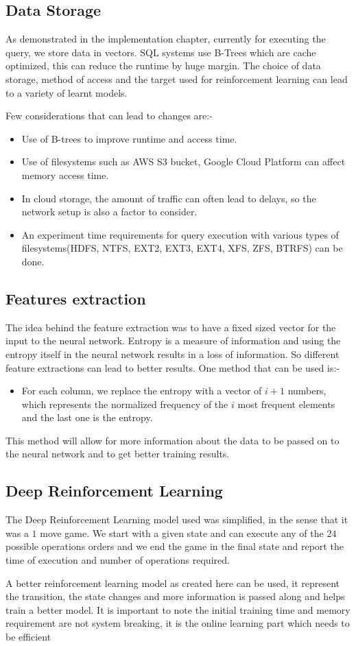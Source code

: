 \subsection{Data Storage}
As demonstrated in the implementation chapter, currently for executing the query, we store data in vectors. SQL systems use B-Trees which are cache optimized, this can reduce the runtime by huge margin. The choice of data storage, method of access and the target used for reinforcement learning can lead to a variety of learnt models.
\par Few considerations that can lead to changes are:-
\begin{itemize}
    \item Use of B-trees to improve runtime and access time.
    \item Use of filesystems such as AWS S3 bucket, Google Cloud Platform can affect memory access time.
    \item In cloud storage, the amount of traffic can often lead to delays, so the network setup is also a factor to consider.
    \item An experiment time requirements for query execution with various types of filesystems(HDFS, NTFS, EXT2, EXT3, EXT4, XFS, ZFS, BTRFS) can be done. 
\end{itemize} 

\subsection{Features extraction}
The idea behind the feature extraction was to have a fixed sized vector for the input to the neural network. Entropy is a measure of information and using the entropy itself in the neural network results in a loss of information. So different feature extractions can lead to better results. One method that can be used is:-
\begin{itemize}
    \item For each column, we replace the entropy with a vector of $i+1$ numbers, which represents the normalized frequency of the $i$ most frequent elements and the last one is the entropy.
\end{itemize}
This method will allow for more information about the data to be passed on to the neural network and to get better training results.


\subsection{Deep Reinforcement Learning}
The Deep Reinforcement Learning model used was simplified, in the sense that it was a $1$ move game. We start with a given state and can execute any of the $24$ possible operations orders and we end the game in the final state and report the time of execution and number of operations required.
\par A better reinforcement learning model as created here\cite{drl_dbms} can be used, it represent the transition, the state changes and more information is passed along and helps train a better model. It is important to note the initial training time and memory requirement are not system breaking, it is the online learning part which needs to be efficient

